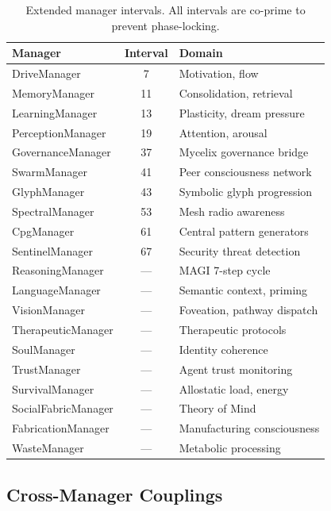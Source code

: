 \documentclass[12pt]{book}
\begin{document}
\begin{table}[H]
\centering
\caption{Extended manager intervals. All intervals are co-prime to prevent phase-locking.}
\label{tab:extended-managers}
\small
\begin{tabular}{lcl}
\toprule
\textbf{Manager} & \textbf{Interval} & \textbf{Domain} \\
\midrule
DriveManager       & 7  & Motivation, flow \\
MemoryManager      & 11 & Consolidation, retrieval \\
LearningManager    & 13 & Plasticity, dream pressure \\
PerceptionManager  & 19 & Attention, arousal \\
GovernanceManager  & 37 & Mycelix governance bridge \\
SwarmManager       & 41 & Peer consciousness network \\
GlyphManager       & 43 & Symbolic glyph progression \\
SpectralManager    & 53 & Mesh radio awareness \\
CpgManager         & 61 & Central pattern generators \\
SentinelManager    & 67 & Security threat detection \\
\addlinespace
ReasoningManager   & --- & MAGI 7-step cycle \\
LanguageManager    & --- & Semantic context, priming \\
VisionManager      & --- & Foveation, pathway dispatch \\
TherapeuticManager & --- & Therapeutic protocols \\
SoulManager        & --- & Identity coherence \\
TrustManager       & --- & Agent trust monitoring \\
SurvivalManager    & --- & Allostatic load, energy \\
SocialFabricManager & --- & Theory of Mind \\
FabricationManager & --- & Manufacturing consciousness \\
WasteManager       & --- & Metabolic processing \\
\bottomrule
\end{tabular}
\end{table}

\subsection{Cross-Manager Couplings}
\end{document}
